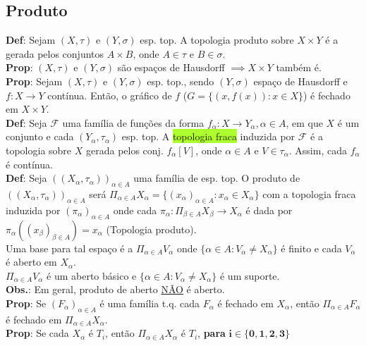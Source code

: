 \documentclass{article}
\begin{document}
\begin{landscape}
\begin{center}
\section{Produto}
\end{center}
\begin{multicols}{3} 
\textbf{Def}: Sejam $(X,\tau)$ e $(Y, \sigma)$ esp. top. A topologia produto sobre $X \times Y$ é a gerada pelos conjuntos $A \times B$, onde $A\in \tau$ e $B \in \sigma$.\\
\textbf{Prop}: $(X, \tau)$ e $(Y, \sigma)$ são espaços de Hausdorff $\implies X\times Y$ também é.\\
\textbf{Prop}: Sejam $(X,\tau)$ e $(Y, \sigma)$ esp. top., sendo $(Y, \sigma)$ espaço de Hausdorff e $f:X\rightarrow Y$ contínua. Então, o gráfico de $f$ ($G = \{(x,f(x)): x \in X\}$) é fechado em $X \times Y$.\\
\textbf{Def}: Seja $\mathcal{F}$ uma família de funções da forma $f_{\alpha}: X \rightarrow Y_{\alpha},\alpha \in A$, em que $X$ é um conjunto e cada $(Y_\alpha,\tau_\alpha)$ esp. top. A \colorbox{GreenYellow}{topologia fraca} induzida por $\mathcal{F}$ é a topologia sobre $X$ gerada pelos conj. $f_\alpha[V]$, onde $\alpha \in A$ e $V \in \tau_\alpha$. Assim, cada $f_\alpha$ é contínua.\\
\textbf{Def}: Seja $((X_\alpha, \tau_\alpha))_{\alpha \in A}$ uma família de esp. top. O produto de $((X_\alpha, \tau_\alpha))_{\alpha \in A}$ será $\Pi _{\alpha \in A}X_\alpha = \{(x_\alpha)_{\alpha \in A}:x_\alpha \in X_\alpha\}$ com a topologia fraca induzida por $(\pi_\alpha)_{\alpha \in A}$ onde cada $\pi_\alpha:\Pi_{\beta \in A}X_\beta \rightarrow X_\alpha$ é dada por $\pi_\alpha((x_\beta)_{\beta \in A})=x_\alpha$ (Topologia produto).\\
Uma base para tal espaço é a $\Pi_{\alpha \in A}V_\alpha$ onde $\{\alpha \in A: V_\alpha \neq X_\alpha\}$ é finito e cada $V_\alpha$ é aberto em $X_\alpha$.\\
$\Pi_{\alpha \in A}V_\alpha$ é um aberto básico e $\{\alpha \in A: V_\alpha \neq X_\alpha\}$ é um suporte.\\
\textbf{Obs.}: Em geral, produto de aberto \underline{NÃO} é aberto.\\
\textbf{Prop}: Se $(F_\alpha)_{\alpha \in A}$ é uma família t.q. cada $F_\alpha$ é fechado em $X_\alpha$, então $\Pi_{\alpha \in A}F_\alpha$ é fechado em $\Pi_{\alpha \in A}X_\alpha$.\\
\textbf{Prop}: Se cada $X_\alpha$ é $T_i$, então $\Pi_{\alpha \in A} X_\alpha$ é $T_i$, \textbf{para} $\mathbf{i \in \{0,1,2,3\}}$

\end{multicols}
\end{landscape}
\end{document}
